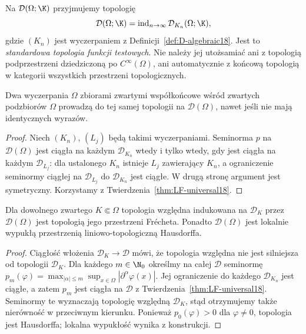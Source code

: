 \begin{definicja}
\label{def:D-LF18}
Na $\mathcal D(\Omega;\K)$ przyjmujemy topologię
\[
 \mathcal D(\Omega;\K)
   =\operatorname{ind}_{n\to\infty}\mathcal D_{K_n}(\Omega;\K),
\]
gdzie $(K_n)$ jest wyczerpaniem z
Definicji~\ref{def:D-algebraic18}. Jest to \emph{standardowa
topologia funkcji testowych}. Nie należy jej utożsamiać
ani z topologią podprzestrzeni dziedziczoną po
$C^\infty(\Omega)$, ani automatycznie z końcową topologią
w kategorii wszystkich przestrzeni topologicznych.
\end{definicja}

\begin{stwierdzenie}
\label{prop:D-independence18}
Dwa wyczerpania $\Omega$ zbiorami zwartymi współkońcowe
wśród zwartych podzbiorów $\Omega$ prowadzą do tej samej
topologii na $\mathcal D(\Omega)$, nawet jeśli nie mają
identycznych wyrazów.
\end{stwierdzenie}
\begin{proof}
Niech $(K_n)$, $(L_j)$ będą takimi wyczerpaniami.
Seminorma $p$ na $\mathcal D(\Omega)$ jest ciągła na
każdym $\mathcal D_{K_n}$ wtedy i tylko wtedy, gdy jest
ciągła na każdym $\mathcal D_{L_j}$: dla ustalonego $K_n$
istnieje $L_j$ zawierający $K_n$, a ograniczenie seminormy
ciągłej na $\mathcal D_{L_j}$ do $\mathcal D_{K_n}$ jest
ciągłe. W drugą stronę argument jest symetryczny.
Korzystamy z Twierdzenia~\ref{thm:LF-universal18}.
\end{proof}

\begin{twierdzenie}
\label{thm:D-stage18}
Dla dowolnego zwartego $K\Subset\Omega$ topologia względna
indukowana na $\mathcal D_K$ przez $\mathcal D(\Omega)$
jest topologią jego przestrzeni Fr\'echeta.
Ponadto $\mathcal D(\Omega)$ jest lokalnie wypukłą
przestrzenią liniowo-topologiczną Hausdorffa.
\end{twierdzenie}
\begin{proof}
Ciągłość włożenia $\mathcal D_K\to\mathcal D$ mówi, że
topologia względna nie jest silniejsza od topologii
$\mathcal D_K$. Dla każdego $m\in\N_0$ określmy na
całej $\mathcal D$ seminormę
$p_m(\varphi)=\max_{|\alpha|\le m}\sup_{x\in\Omega}
|\partial^\alpha\varphi(x)|$. Jej ograniczenie do
każdego $\mathcal D_{K_n}$ jest ciągłe, a zatem $p_m$
jest ciągła na $\mathcal D$ z
Twierdzenia~\ref{thm:LF-universal18}. Seminormy te
wyznaczają topologię względną $\mathcal D_K$, stąd
otrzymujemy także nierówność w przeciwnym kierunku.
Ponieważ $p_0(\varphi)>0$ dla $\varphi\ne0$, topologia
jest Hausdorffa; lokalna wypukłość wynika z konstrukcji.
\end{proof}

